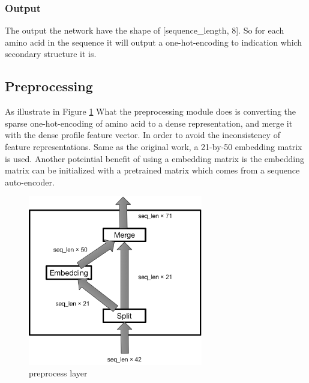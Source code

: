\subsubsection{Output}
The output the network have the shape of [sequence\_length, 8]. So for each amino acid in the sequence it will output a one-hot-encoding to indication which secondary structure it is.


\subsection{Preprocessing}
As illustrate in Figure \ref{fig:pre} What the preprocessing module does is converting the sparse one-hot-encoding of amino acid to a dense representation, and merge it with the dense profile feature vector. In order to avoid the inconsistency of feature representations. Same as the original work, a 21-by-50 embedding matrix is used. 
Another poteintial benefit of using a embedding matrix is the embedding matrix can be initialized with a pretrained matrix which comes from a sequence auto-encoder.

\begin{figure}[H] 
	\centering
	\includegraphics[width=3in]{Figures/preprocessing}
	\caption[preprocess layer]{preprocess layer}
	\label{fig:pre}
\end{figure}

